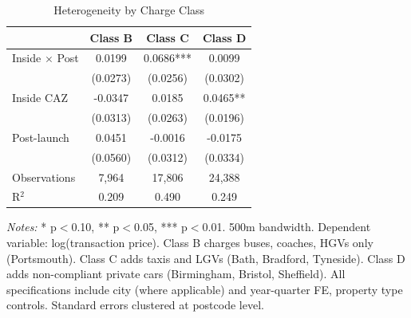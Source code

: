 \begin{table}
\centering
\caption{Heterogeneity by Charge Class\label{tab:class}}
\centering
\begin{tabular}[t]{lccc}
\toprule
  & Class B & Class C & Class D\\
\midrule
Inside $\times$ Post & 0.0199 & 0.0686*** & 0.0099\\
 & (0.0273) & (0.0256) & (0.0302)\\
Inside CAZ & -0.0347 & 0.0185 & 0.0465**\\
 & (0.0313) & (0.0263) & (0.0196)\\
Post-launch & 0.0451 & -0.0016 & -0.0175\\
 & (0.0560) & (0.0312) & (0.0334)\\
\midrule
Observations & 7,964 & 17,806 & 24,388\\
R$^2$ & 0.209 & 0.490 & 0.249\\
\bottomrule
\end{tabular}
\vspace{0.5em}
\begin{minipage}{0.95\textwidth}
\footnotesize
\textit{Notes:} * p$<$0.10, ** p$<$0.05, *** p$<$0.01. 500m bandwidth. Dependent variable: log(transaction price). Class B charges buses, coaches, HGVs only (Portsmouth). Class C adds taxis and LGVs (Bath, Bradford, Tyneside). Class D adds non-compliant private cars (Birmingham, Bristol, Sheffield). All specifications include city (where applicable) and year-quarter FE, property type controls. Standard errors clustered at postcode level.
\end{minipage}
\end{table}

